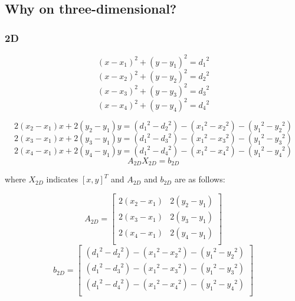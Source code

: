 \documentclass{ieeeaccess}
\begin{document}
\subsection{Why on three-dimensional?}
\subsubsection{2D}
\begin{equation}
(x-x_1)^2+(y-y_1)^2={d_1}^2
\end{equation}
\begin{equation}
(x-x_2)^2+(y-y_2)^2={d_2}^2
\end{equation}
\begin{equation}
(x-x_3)^2+(y-y_3)^2={d_3}^2
\end{equation}
\begin{equation}
(x-x_4)^2+(y-y_4)^2={d_4}^2
\end{equation}

\begin{equation}
2(x_2-x_1)x+2(y_2-y_1)y=({d_1}^2-{d_2}^2)-({x_1}^2-{x_2}^2)-({y_1}^2-{y_2}^2)
\end{equation}
\begin{equation}
2(x_3-x_1)x+2(y_3-y_1)y=({d_1}^2-{d_3}^2)-({x_1}^2-{x_3}^2)-({y_1}^2-{y_3}^2)
\end{equation}
\begin{equation}
2(x_4-x_1)x+2(y_4-y_1)y=({d_1}^2-{d_4}^2)-({x_1}^2-{x_4}^2)-({y_1}^2-{y_4}^2)
\end{equation}
\begin{equation}
A_{2D}X_{2D}=b_{2D}
\end{equation}

where $X_{2D}$ indicates $[x,y]^T$ and $A_{2D}$ and $b_{2D}$ are as follows: 

\begin{equation}
A_{2D} =\left[ {\begin{array}{cc}
	2(x_2-x_1) & 2(y_2-y_1)\\
	2(x_3-x_1) & 2(y_3-y_1)\\
	2(x_4-x_1) & 2(y_4-y_1)\\
	\end{array} } \right]
\end{equation}
\begin{equation}
b_{2D} = \left[ {\begin{array}{c}
	({d_1}^2-{d_2}^2)-({x_1}^2-{x_2}^2)-({y_1}^2-{y_2}^2)\\
	({d_1}^2-{d_3}^2)-({x_1}^2-{x_3}^2)-({y_1}^2-{y_3}^2)\\
	({d_1}^2-{d_4}^2)-({x_1}^2-{x_4}^2)-({y_1}^2-{y_4}^2)\\
	\end{array} } \right]
\end{equation}
\end{document}
